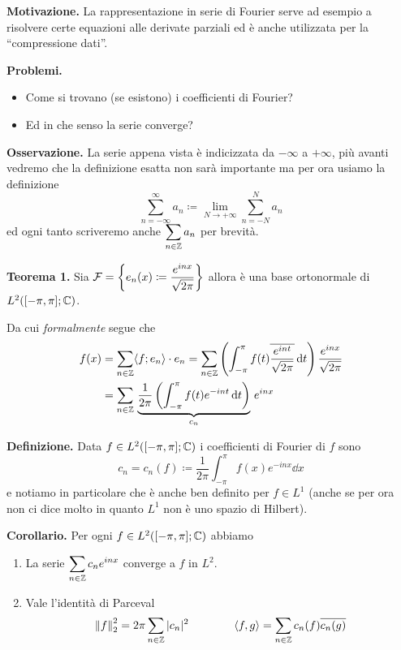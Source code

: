 \textbf{Motivazione.}
La rappresentazione in serie di Fourier serve ad esempio a risolvere certe equazioni alle derivate parziali ed è anche utilizzata per la ``compressione dati''.

\textbf{Problemi.}
\begin{itemize}
	\item Come si trovano (se esistono) i coefficienti di Fourier?
	\item Ed in che senso la serie converge?
\end{itemize}

\textbf{Osservazione.}
La serie appena vista è indicizzata da $-\infty$ a $+\infty$, più avanti vedremo che la definizione esatta non sarà importante ma per ora usiamo la definizione
$$
\sum_{n=-\infty}^\infty a_n \coloneqq \lim_{N \to +\infty} \sum_{n = -N}^N a_n
$$
ed ogni tanto scriveremo anche $\displaystyle \sum_{n \in \mathbb Z} a_n$ per brevità.

\textbf{Teorema 1.}
Sia $\displaystyle\mathcal F = \left\{ e_n(x) \coloneqq \frac{e^{inx}}{\sqrt{2\pi}} \right\}$ allora è una base ortonormale di $L^2([-\pi, \pi]; \mathbb C)$.

Da cui \textit{formalmente} segue che
$$
\begin{aligned}
	f(x) 
	&= \sum_{n \in \mathbb Z} \langle f; e_n \rangle \cdot e_n
	= \sum_{n \in \mathbb Z} \left( \int_{-\pi}^\pi f(t) \overline{\frac{e^{int}}{\sqrt{2\pi}}} \,\mathrm{d} t \right) \frac{e^{inx}}{\sqrt{2\pi}} \\
	&= \sum_{n \in \mathbb Z} \, \underbrace{\frac{1}{2\pi} \left( \int_{-\pi}^\pi f(t) e^{-int} \,\mathrm{d} t \right)}_{c_n} \, e^{inx}
\end{aligned}
$$

\textbf{Definizione.}
Data $f \in L^2([-\pi, \pi]; \mathbb C)$ i coefficienti di Fourier di $f$ sono
$$
c_n = c_n(f) \coloneqq \frac{1}{2\pi} \int_{-\pi}^\pi f(x) e^{-inx} \dd x
$$
e notiamo in particolare che è anche ben definito per $f \in L^1$ (anche se per ora non ci dice molto in quanto $L^1$ non è uno spazio di Hilbert).

\textbf{Corollario.}
Per ogni $f \in L^2([-\pi, \pi]; \mathbb C)$ abbiamo
\begin{enumerate}
	\item \label{item:4nov2021_cor1_1} 
		La serie $\displaystyle \sum_{n \in \mathbb Z} c_n e^{inx}$ converge a $f$ in $L^2$.

	\item Vale l'identità di Parceval
		$$
		\left\lVert f \right\rVert_2^2 = 2 \pi \sum_{n \in \mathbb Z} |c_n|^2
		\qquad
		\qquad
		\langle f, g \rangle = \sum_{n \in \mathbb Z} c_n(f) \overline{c_n(g)}
		$$
\end{enumerate}

